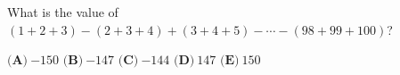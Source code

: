 What is the value of $(1+2+3)-(2+3+4)+(3+4+5)-\cdots-(98+99+100)$?

$\textbf{(A)}\ $$-150$ \qquad $\textbf{(B)}\ $$-147$ \qquad $\textbf{(C)}\ $$-144$ \qquad $\textbf{(D)}\ $$147$ \qquad $\textbf{(E)}\ $$150$
